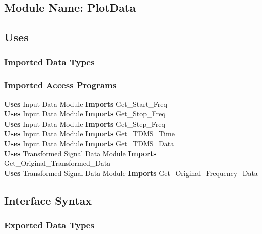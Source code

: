 \documentclass[12pt]{article}
\begin{document}
\subsection{Module Name: PlotData}
\subsection{Uses}
\subsubsection{Imported Data Types}

\subsubsection{Imported Access Programs}
\textbf{Uses} Input Data Module \textbf{Imports} Get\_Start\_Freq\\
\textbf{Uses} Input Data Module \textbf{Imports} Get\_Stop\_Freq\\
\textbf{Uses} Input Data Module \textbf{Imports} Get\_Step\_Freq\\
\textbf{Uses} Input Data Module \textbf{Imports} Get\_TDMS\_Time\\
\textbf{Uses} Input Data Module \textbf{Imports} Get\_TDMS\_Data\\
\textbf{Uses} Transformed Signal Data Module \textbf{Imports} 
Get\_Original\_Transformed\_Data\\
\textbf{Uses} Transformed Signal Data Module \textbf{Imports} 
Get\_Original\_Frequency\_Data
\subsection{Interface Syntax}
\subsubsection{Exported Data Types}
\end{document}
